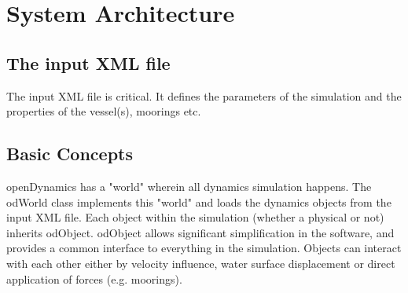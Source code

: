 \chapter{System Architecture}
\section{The input XML file}
The input XML file is critical. It defines the parameters of the simulation and the properties of the vessel(s), moorings etc.

\section{Basic Concepts}
openDynamics has a "world" wherein all dynamics simulation happens. The odWorld class implements this "world" and loads the dynamics objects from the input XML file. Each object within the simulation (whether a physical or not) inherits odObject. odObject allows significant simplification in the software, and provides a common interface to everything in the simulation. Objects can interact with each other either by velocity influence, water surface displacement or direct application of forces (e.g. moorings).

